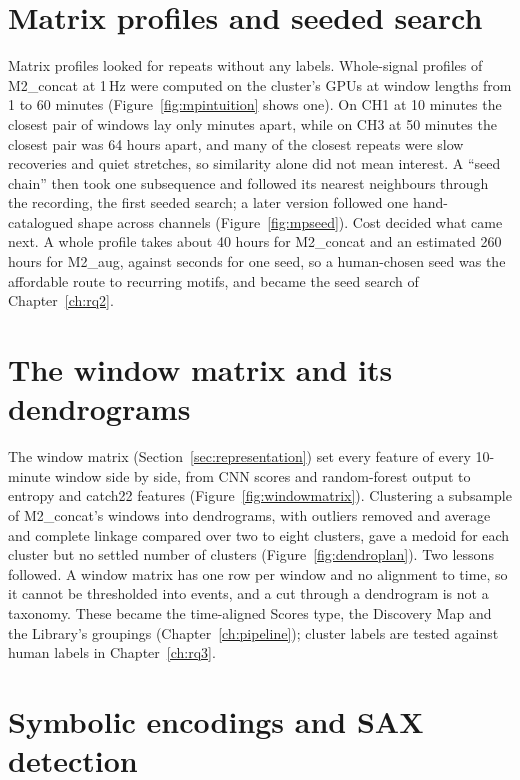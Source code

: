 \section{Matrix profiles and seeded search}
\label{sec:earlymp}

Matrix profiles looked for repeats without any labels. Whole-signal profiles of M2\_concat at 1\,Hz were computed on the cluster's GPUs at window lengths from 1 to 60 minutes (Figure~\ref{fig:mpintuition} shows one). On CH1 at 10 minutes the closest pair of windows lay only minutes apart, while on CH3 at 50 minutes the closest pair was 64 hours apart, and many of the closest repeats were slow recoveries and quiet stretches, so similarity alone did not mean interest. A ``seed chain'' then took one subsequence and followed its nearest neighbours through the recording, the first seeded search; a later version followed one hand-catalogued shape across channels (Figure~\ref{fig:mpseed}). Cost decided what came next. A whole profile takes about 40 hours for M2\_concat and an estimated 260 hours for M2\_aug, against seconds for one seed, so a human-chosen seed was the affordable route to recurring motifs, and became the seed search of Chapter~\ref{ch:rq2}.

\section{The window matrix and its dendrograms}
\label{sec:earlywm}

The window matrix (Section~\ref{sec:representation}) set every feature of every 10-minute window side by side, from CNN scores and random-forest output to entropy and catch22 features (Figure~\ref{fig:windowmatrix}). Clustering a subsample of M2\_concat's windows into dendrograms, with outliers removed and average and complete linkage compared over two to eight clusters, gave a medoid for each cluster but no settled number of clusters (Figure~\ref{fig:dendroplan}). Two lessons followed. A window matrix has one row per window and no alignment to time, so it cannot be thresholded into events, and a cut through a dendrogram is not a taxonomy. These became the time-aligned Scores type, the Discovery Map and the Library's groupings (Chapter~\ref{ch:pipeline}); cluster labels are tested against human labels in Chapter~\ref{ch:rq3}.

\section{Symbolic encodings and SAX detection}
\label{sec:earlysax}

